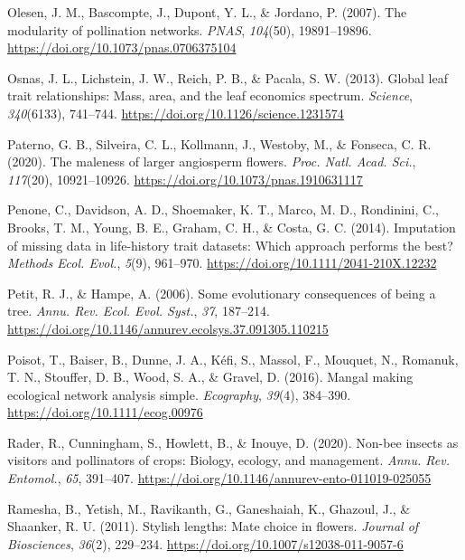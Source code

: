 \documentclass[
  12pt,
  a4paper,
]{article}
\newlength{\cslhangindent}
\newlength{\cslentryspacingunit} %
\newenvironment{CSLReferences}[2] %
 {%
  \setlength{\parindent}{0pt}
  \ifodd #1
  \let\oldpar\par
  \def\par{\hangindent=\cslhangindent\oldpar}
  \fi
  \setlength{\parskip}{#2\cslentryspacingunit}
 }%
 {}
\begin{document}
\begin{CSLReferences}{1}{0}
\leavevmode{}%
Olesen, J. M., Bascompte, J., Dupont, Y. L., \& Jordano, P. (2007). The modularity of pollination networks. \emph{PNAS}, \emph{104}(50), 19891--19896. \url{https://doi.org/10.1073/pnas.0706375104}

\leavevmode{}%
Osnas, J. L., Lichstein, J. W., Reich, P. B., \& Pacala, S. W. (2013). Global leaf trait relationships: Mass, area, and the leaf economics spectrum. \emph{Science}, \emph{340}(6133), 741--744. \url{https://doi.org/10.1126/science.1231574}

\leavevmode{}%
Paterno, G. B., Silveira, C. L., Kollmann, J., Westoby, M., \& Fonseca, C. R. (2020). The maleness of larger angiosperm flowers. \emph{Proc. Natl. Acad. Sci.}, \emph{117}(20), 10921--10926. \url{https://doi.org/10.1073/pnas.1910631117}

\leavevmode{}%
Penone, C., Davidson, A. D., Shoemaker, K. T., Marco, M. D., Rondinini, C., Brooks, T. M., Young, B. E., Graham, C. H., \& Costa, G. C. (2014). Imputation of missing data in life-history trait datasets: Which approach performs the best? \emph{Methods Ecol. Evol.}, \emph{5}(9), 961--970. \url{https://doi.org/10.1111/2041-210X.12232}

\leavevmode{}%
Petit, R. J., \& Hampe, A. (2006). Some evolutionary consequences of being a tree. \emph{Annu. Rev. Ecol. Evol. Syst.}, \emph{37}, 187--214. \url{https://doi.org/10.1146/annurev.ecolsys.37.091305.110215}

\leavevmode{}%
Poisot, T., Baiser, B., Dunne, J. A., Kéfi, S., Massol, F., Mouquet, N., Romanuk, T. N., Stouffer, D. B., Wood, S. A., \& Gravel, D. (2016). Mangal \textendash{} making ecological network analysis simple. \emph{Ecography}, \emph{39}(4), 384--390. \url{https://doi.org/10.1111/ecog.00976}

\leavevmode{}%
Rader, R., Cunningham, S., Howlett, B., \& Inouye, D. (2020). Non-bee insects as visitors and pollinators of crops: Biology, ecology, and management. \emph{Annu. Rev. Entomol.}, \emph{65}, 391--407. \url{https://doi.org/10.1146/annurev-ento-011019-025055}

\leavevmode{}%
Ramesha, B., Yetish, M., Ravikanth, G., Ganeshaiah, K., Ghazoul, J., \& Shaanker, R. U. (2011). Stylish lengths: Mate choice in flowers. \emph{Journal of Biosciences}, \emph{36}(2), 229--234. \url{https://doi.org/10.1007/s12038-011-9057-6}


\end{CSLReferences}
\end{document}
